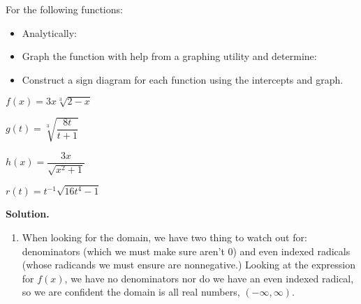 \begin{ex}  For the following functions:

\begin{itemize}

\item Analytically:


\item Graph the function with help from a graphing utility and determine:


\item Construct a sign diagram for each function using the intercepts and graph.

\end{itemize}

\begin{shortenumerate}[MMMMMMMMMMMMM]
\item  $f(x) = 3x \sqrt[3]{2-x}$ 
\item  $g(t) = \sqrt[3]{\dfrac{8t}{t+1}}$
\item  $h(x) = \dfrac{3x}{\sqrt{x^2 + 1}}$
\item  $r(t) = t^{-1} \sqrt{16t^4-1}$ 
\end{shortenumerate}

{\bf Solution.} 

\begin{enumerate}

\item  When looking for the domain, we have two thing to watch out for:  denominators (which we must make sure aren't $0$) and even indexed radicals (whose radicands we must ensure are nonnegative.)  Looking at the expression for $f(x)$, we have no denominators nor do we have an even indexed radical, so we are confident the domain is all real numbers, $(-\infty, \infty)$. 


\end{enumerate}
\end{ex}
